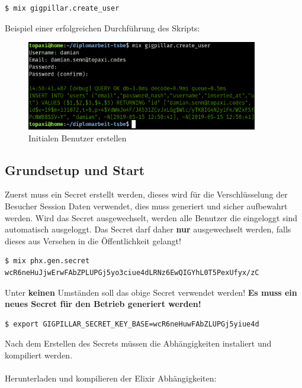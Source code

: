 \begin{lstlisting}[language=bash,frame=single]
$ mix gigpillar.create_user
\end{lstlisting}

\noindent{}Beispiel einer erfolgreichen Durchführung des Skripts:

\begin{figure}[!htb]
  \centering
  \includegraphics[width=0.9\textwidth]{einfuehrung/create-user.png}
  \caption{Initialen Benutzer erstellen}
\end{figure}

\clearpage
\subsection{Grundsetup und Start}

Zuerst muss ein Secret erstellt werden, dieses wird für die Verschlüsselung der
Besucher Session Daten verwendet, dies muss generiert und sicher aufbewahrt
werden. Wird das Secret ausgewechselt, werden alle Benutzer die eingeloggt sind
automatisch ausgeloggt. Das Secret darf daher \textbf{nur} ausgewechselt
werden, falls dieses aus Versehen in die Öffentlichkeit gelangt!

\begin{lstlisting}[language=bash,frame=single]
$ mix phx.gen.secret
wcR6neHuJjwErwFAbZPLUPGj5yo3ciue4dLRNz6EwQIGYhL0T5PexUfyx/zC
\end{lstlisting}

\noindent{}Unter \textbf{keinen} Umständen soll das obige Secret verwendet werden!
\textbf{Es muss ein neues Secret für den Betrieb generiert werden!}

\begin{lstlisting}[language=bash,frame=single]
$ export GIGPILLAR_SECRET_KEY_BASE=wcR6neHuwFAbZLUPGj5yiue4d
\end{lstlisting}

\noindent{}Nach dem Erstellen des Secrets müssen die Abhängigkeiten instaliert und
kompiliert werden.\\
\\
\noindent{}Herunterladen und kompilieren der Elixir Abhängigkeiten:

